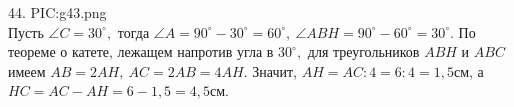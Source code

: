 44. {{PIC:g43.png}}\\
Пусть $\angle C=30^\circ,$ тогда $\angle A=90^\circ-30^\circ=60^\circ,\ \angle ABH=90^\circ-60^\circ=30^\circ.$ По теореме о катете, лежащем напротив угла в $30^\circ,$ для треугольников $ABH$ и $ABC$ имеем $AB=2AH,\ AC=2AB=4AH.$ Значит, $AH=AC:4=6:4=1,5$см, а $HC=AC-AH=6-1,5=4,5$см.\\
